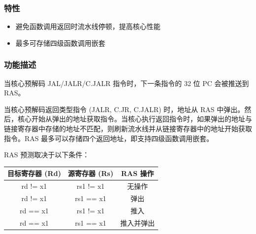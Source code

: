 \documentclass[main\_\_CN.tex]{subfiles}
\begin{document}
\subsubsection{特性}
\label{sec:riscvcpu-perf-ras-features}

\begin{itemize}
    \item 避免函数调用返回时流水线停顿，提高核心性能
    \item 最多可存储四级函数调用嵌套
\end{itemize}


\subsubsection{功能描述}
\label{sec:riscvcpu-perf-ras-func-descr}
当核心预解码 JAL/JALR/C.JALR 指令时，下一条指令的 32 位 PC 会被推送到 RAS。

当核心预解码返回类型指令 (JALR, C.JR, C.JALR) 时，地址从 RAS 中弹出。然后，核心开始从弹出的地址获取指令。当核心执行返回指令时，如果弹出的地址与链接寄存器中存储的地址不匹配，则刷新流水线并从链接寄存器中的地址开始获取指令。RAS 最多可以存储四个返回地址，即支持四级函数调用嵌套。

RAS 预测取决于以下条件：

\begin{longtable}{ | c | c | c | }
\hline\rowcolor{lightgray}
目标寄存器 (Rd) & 源寄存器 (Rs) & RAS 操作 \\ \hline
\endfirsthead
\hline
rd != x1 & rs1 != x1 & 无操作 \\ \hline
rd != x1 & rs1 == x1 & 弹出 \\ \hline
rd == x1 & rs1 != x1 & 推入 \\ \hline
rd == x1 & rs1 == x1 & 推入并弹出 \\ \hline
\end{longtable}
\end{document}
